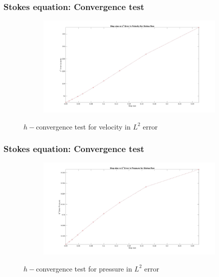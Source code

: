 \documentclass{beamer}
\begin{document}
\begin{frame}
\frametitle{Stokes equation: Convergence test}
\begin{figure}
\begin{subfigure}{\textwidth}	
  \includegraphics[width=\linewidth]{l2_velocity_stokes.jpg}
  \label{fig:vel_stoke_conv}
\end{subfigure}
\caption{$h-$convergence test for velocity in $L^2$ error}
\end{figure}
\end{frame}
\begin{frame}
\frametitle{Stokes equation: Convergence test}
\begin{figure}
\begin{subfigure}{\textwidth}	
  \includegraphics[width=\linewidth]{l2_pressure_stokes.jpg}
  \label{fig:pre_stoke_conv}
\end{subfigure}
\caption{$h-$convergence test for pressure in $L^2$ error}
\end{figure}
\end{frame}
\end{document}
